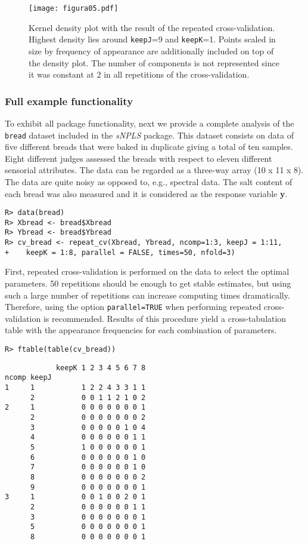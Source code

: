 \begin{figure}[hbtp]
	\centering
\texttt{[image: figura05.pdf]}
\caption{Kernel density plot with the result of the repeated cross-validation. Highest density lies around \texttt{keepJ}=9 and \texttt{keepK}=1. Points scaled in size by frequency of appearance are additionally included on top of the density plot. The number of components is not represented since it was constant at 2 in all repetitions of the cross-validation.}
\label{figura05}
\end{figure}
\subsubsection{Full example functionality}
To exhibit all package functionality, next we provide a complete analysis of the \texttt{bread} dataset \parencite{bro1998multi} included in the \textit{sNPLS} package. This dataset consists on data of five different breads that were baked in duplicate giving a total of ten samples. Eight different judges assessed the breads with respect to eleven different sensorial attributes. The data can be regarded as a three-way array (10 x 11 x 8). The data are quite noisy as opposed to, e.g., spectral data. The salt content of each bread was also measured and it is considered as the response variable \textbf{y}.

\begin{verbatim}
R> data(bread)
R> Xbread <- bread$Xbread
R> Ybread <- bread$Ybread
R> cv_bread <- repeat_cv(Xbread, Ybread, ncomp=1:3, keepJ = 1:11,   
+    keepK = 1:8, parallel = FALSE, times=50, nfold=3)
\end{verbatim}

First, repeated cross-validation is performed on the data to select the optimal parameters. 50 repetitions should be enough to get stable estimates, but using such a large number of repetitions can increase computing times dramatically. Therefore, using the option \texttt{parallel=TRUE} when performing repeated cross-validation is recommended. Results of this procedure yield a cross-tabulation table with the appearance frequencies for each combination of parameters.

\begin{verbatim}
R> ftable(table(cv_bread)) 
\end{verbatim}

\begin{verbatim}
            keepK 1 2 3 4 5 6 7 8
ncomp keepJ                      
1     1           1 2 2 4 3 3 1 1
      2           0 0 1 1 2 1 0 2
2     1           0 0 0 0 0 0 0 1
      2           0 0 0 0 0 0 0 2
      3           0 0 0 0 0 1 0 4
      4           0 0 0 0 0 0 1 1
      5           1 0 0 0 0 0 0 1
      6           0 0 0 0 0 0 1 0
      7           0 0 0 0 0 0 1 0
      8           0 0 0 0 0 0 0 2
      9           0 0 0 0 0 0 0 1
3     1           0 0 1 0 0 2 0 1
      2           0 0 0 0 0 0 1 1
      3           0 0 0 0 0 0 0 1
      5           0 0 0 0 0 0 0 1
      8           0 0 0 0 0 0 0 1
\end{verbatim}      
      
